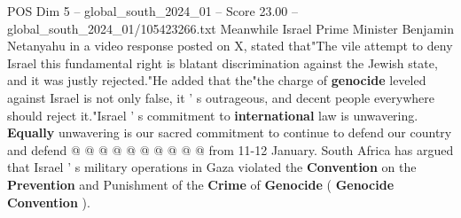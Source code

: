 \begin{textsample}{POS Dim 5 – global\_south\_2024\_01 – Score 23.00 – global\_south\_2024\_01/105423266.txt}
Meanwhile Israel Prime Minister Benjamin Netanyahu in a video response posted on X, stated that"The vile attempt to deny Israel this fundamental right is blatant discrimination against the Jewish state, and it was justly rejected."He added that the"the charge of \textbf{genocide} leveled against Israel is not only false, it ' s outrageous, and decent people everywhere should reject it."Israel ' s commitment to \textbf{international} law is unwavering. \textbf{Equally} unwavering is our sacred commitment to continue to defend our country and defend @ @ @ @ @ @ @ @ @ @ from 11-12 January.
South Africa has argued that Israel ' s military operations in Gaza violated the \textbf{Convention} on the \textbf{Prevention} and Punishment of the \textbf{Crime} of \textbf{Genocide} ( \textbf{Genocide} \textbf{Convention} ).

\end{textsample}
